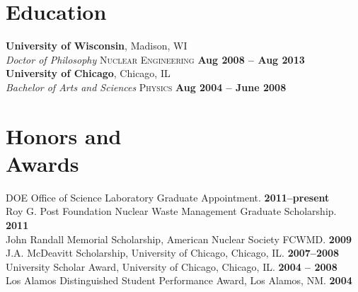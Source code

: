 \documentclass[margin,line]{resume}
\begin{document}
\begin{resume}
    \vspace{-3mm}
    \section{\mysidestyle Education}

    \textbf{University of Wisconsin}, Madison, WI \vspace{1mm}\\\vspace{1mm}%
        \textsl{Doctor of Philosophy} \textsc{Nuclear Engineering}\hfill \textbf{ Aug 2008 -- Aug 2013}\\%
    \textbf{University of Chicago}, Chicago, IL \vspace{1mm}\\\vspace{1mm}%
	\textsl{Bachelor of Arts and Sciences}\textsc{ Physics} \hfill \textbf{Aug 2004 -- June 2008}%
    \vspace{-3mm}
    \section{\mysidestyle Honors and\\Awards} 
		DOE Office of Science Laboratory Graduate Appointment.                 \hfill \textbf{2011--present}\vspace{.5mm}\\%
		Roy G. Post Foundation Nuclear Waste Management Graduate Scholarship.       \hfill \textbf{2011}\vspace{.5mm}\\%
		John Randall Memorial Scholarship, American Nuclear Society FCWMD.          \hfill \textbf{2009}\vspace{.5mm}\\%
		J.A. McDeavitt Scholarship, University of Chicago, Chicago, IL.        \hfill\textbf{2007--2008}\vspace{.5mm}\\%
		University Scholar Award, University of Chicago, Chicago, IL.        \hfill\textbf{2004 -- 2008}\vspace{.5mm}\\%
		Los Alamos Distinguished Student Performance Award, Los Alamos, NM.          \hfill\textbf{2004}\vspace{.5mm}%
    \vspace{-3mm}

\end{resume}
\end{document}
